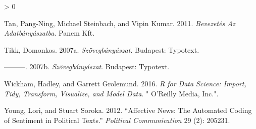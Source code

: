 \documentclass[
]{book}
\newlength{\cslhangindent}
\newenvironment{CSLReferences}[2] %
 {%
  \setlength{\parindent}{0pt}
  \ifodd #1 \everypar{\setlength{\hangindent}{\cslhangindent}}\ignorespaces\fi
  \ifnum #2 > 0
  \setlength{\parskip}{#2\baselineskip}
  \fi
 }%
 {}
\begin{document}
\begin{CSLReferences}{1}{0}
\leavevmode\hypertarget{ref-tan2011a}{}%
Tan, Pang-Ning, Michael Steinbach, and Vipin Kumar. 2011.
\emph{Bevezetés Az Adatbányászatba}. Panem Kft.

\leavevmode\hypertarget{ref-tikk2007}{}%
Tikk, Domonkos. 2007a. \emph{Szövegbányászat}. Budapest: Typotext.

\leavevmode\hypertarget{ref-tikk2007a}{}%
---------. 2007b. \emph{Szövegbányászat}. Budapest: Typotext.

\leavevmode\hypertarget{ref-wickham2016r}{}%
Wickham, Hadley, and Garrett Grolemund. 2016. \emph{R for Data Science:
Import, Tidy, Transform, Visualize, and Model Data}. {"} O'Reilly Media,
Inc.{"}.

\leavevmode\hypertarget{ref-young2012affective}{}%
Young, Lori, and Stuart Soroka. 2012. {``Affective News: The Automated
Coding of Sentiment in Political Texts.''} \emph{Political
Communication} 29 (2): 205231.

\end{CSLReferences}

\backmatter
\end{document}
